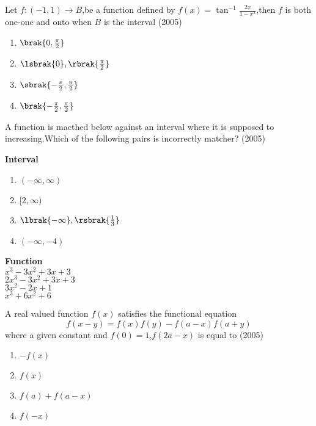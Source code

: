       \item Let $f:(-1,1) \to B$,be a function defined by  $f(x)=\tan^{-1}\frac{2x}{1-x^{2}}$,then $f$ is both one-one and onto when $B$ is the interval \hfill(2005)
             \begin{enumerate}
		     \item $\brak{0,\frac{\pi}{2}}$ \\
		     \item $\lsbrak{0},\rbrak{\frac{\pi}{2}}$ \\
		     \item $\sbrak{-\frac{\pi}{2},\frac{\pi}{2}}$ \\
		     \item $\brak{-\frac{\pi}{2},\frac{\pi}{2}}$
	     \end{enumerate}
     \item A function is macthed below against an interval where it is supposed to increasing.Which of the following pairs is incorrectly matcher? \hfill(2005)
	     \begin{multicols}{2}
		     \textbf{Interval}
                     \begin{enumerate}
                        \item $(-\infty,\infty)$
                        \item $[2,\infty)$
			\item $\lbrak{-\infty},\rsbrak{\frac{1}{3}}$
                        \item $(-\infty,-4)$
                     \end{enumerate}

                  \columnbreak

                    \textbf{Function}\\
                      $x^{3} - 3x^{2} + 3x + 3$\\
                      $2x^{3} - 3x^{2} + 3x + 3$\\
                      $3x^{2} - 2x + 1$\\
                      $x^{3} + 6x^{2} + 6$\\
	     \end{multicols}

     \item A real valued function $f(x)$ satisfies the functional equation $$f(x-y)=f(x)f(y)-f(a-x)f(a+y)$$
	     where a given constant and $f(0)=1$,$f(2a-x)$ is equal to \hfill(2005)
	     \begin{enumerate}
		     \item $-f(x)$
		     \item $f(x)$
		     \item $f(a)+f(a-x)$
		     \item $f(-x)$
	     \end{enumerate}

